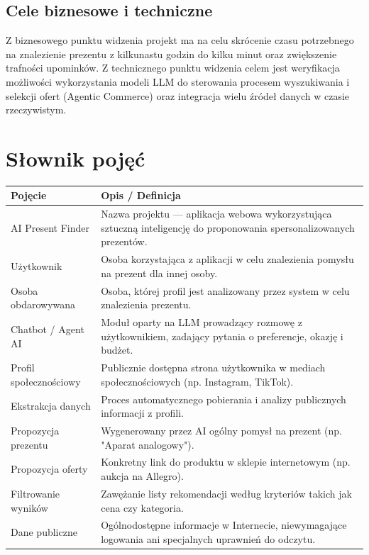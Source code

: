 \documentclass[12pt,a4paper]{article}
\begin{document}
\subsection{Cele biznesowe i techniczne}
Z biznesowego punktu widzenia projekt ma na celu skrócenie czasu potrzebnego na znalezienie prezentu z kilkunastu godzin do kilku minut oraz zwiększenie trafności upominków. Z technicznego punktu widzenia celem jest weryfikacja możliwości wykorzystania modeli LLM do sterowania procesem wyszukiwania i selekcji ofert (Agentic Commerce) oraz integracja wielu źródeł danych w czasie rzeczywistym.

\section{Słownik pojęć}

\begin{tabular}{|p{}|p{}|}
\hline
\textbf{Pojęcie} & \textbf{Opis / Definicja} \\
\hline
AI Present Finder & Nazwa projektu — aplikacja webowa wykorzystująca sztuczną inteligencję do proponowania spersonalizowanych prezentów. \\
\hline
Użytkownik & Osoba korzystająca z aplikacji w celu znalezienia pomysłu na prezent dla innej osoby. \\
\hline
Osoba obdarowywana & Osoba, której profil jest analizowany przez system w celu znalezienia prezentu. \\
\hline
Chatbot / Agent AI & Moduł oparty na LLM prowadzący rozmowę z użytkownikiem, zadający pytania o preferencje, okazję i budżet. \\
\hline
Profil społecznościowy & Publicznie dostępna strona użytkownika w mediach społecznościowych (np. Instagram, TikTok). \\
\hline
Ekstrakcja danych & Proces automatycznego pobierania i analizy publicznych informacji z profili. \\
\hline
Propozycja prezentu & Wygenerowany przez AI ogólny pomysł na prezent (np. "Aparat analogowy"). \\
\hline
Propozycja oferty & Konkretny link do produktu w sklepie internetowym (np. aukcja na Allegro). \\
\hline
Filtrowanie wyników & Zawężanie listy rekomendacji według kryteriów takich jak cena czy kategoria. \\
\hline
Dane publiczne & Ogólnodostępne informacje w Internecie, niewymagające logowania ani specjalnych uprawnień do odczytu. \\
\hline
\end{tabular}
\end{document}
